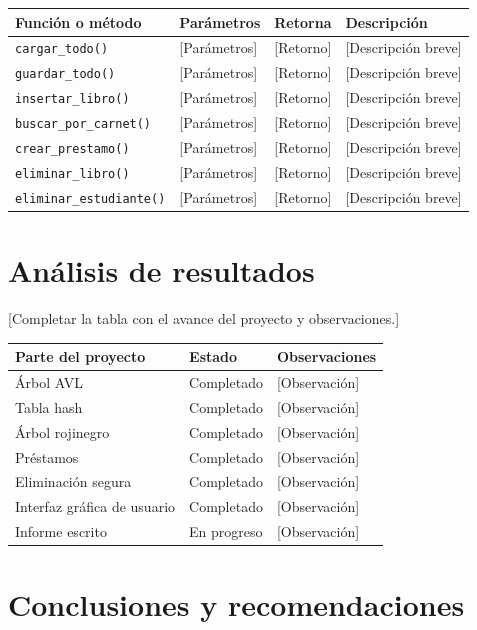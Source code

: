 \documentclass[11pt]{article}
\begin{document}
\begin{longtable}{p{} p{} p{} p{}}
\toprule
\textbf{Función o método} & \textbf{Parámetros} & \textbf{Retorna} & \textbf{Descripción} \\
\midrule
\texttt{cargar\_todo()} & [Parámetros] & [Retorno] & [Descripción breve] \\
\texttt{guardar\_todo()} & [Parámetros] & [Retorno] & [Descripción breve] \\
\texttt{insertar\_libro()} & [Parámetros] & [Retorno] & [Descripción breve] \\
\texttt{buscar\_por\_carnet()} & [Parámetros] & [Retorno] & [Descripción breve] \\
\texttt{crear\_prestamo()} & [Parámetros] & [Retorno] & [Descripción breve] \\
\texttt{eliminar\_libro()} & [Parámetros] & [Retorno] & [Descripción breve] \\
\texttt{eliminar\_estudiante()} & [Parámetros] & [Retorno] & [Descripción breve] \\
\bottomrule
\end{longtable}

\section{Análisis de resultados}

[Completar la tabla con el avance del proyecto y observaciones.]

\begin{longtable}{p{} p{} p{}}
\toprule
\textbf{Parte del proyecto} & \textbf{Estado} & \textbf{Observaciones} \\
\midrule
Árbol AVL & Completado & [Observación] \\
Tabla hash & Completado & [Observación] \\
Árbol rojinegro & Completado & [Observación] \\
Préstamos & Completado & [Observación] \\
Eliminación segura & Completado & [Observación] \\
Interfaz gráfica de usuario & Completado & [Observación] \\
Informe escrito & En progreso & [Observación] \\
\bottomrule
\end{longtable}

\section{Conclusiones y recomendaciones}
\end{document}
